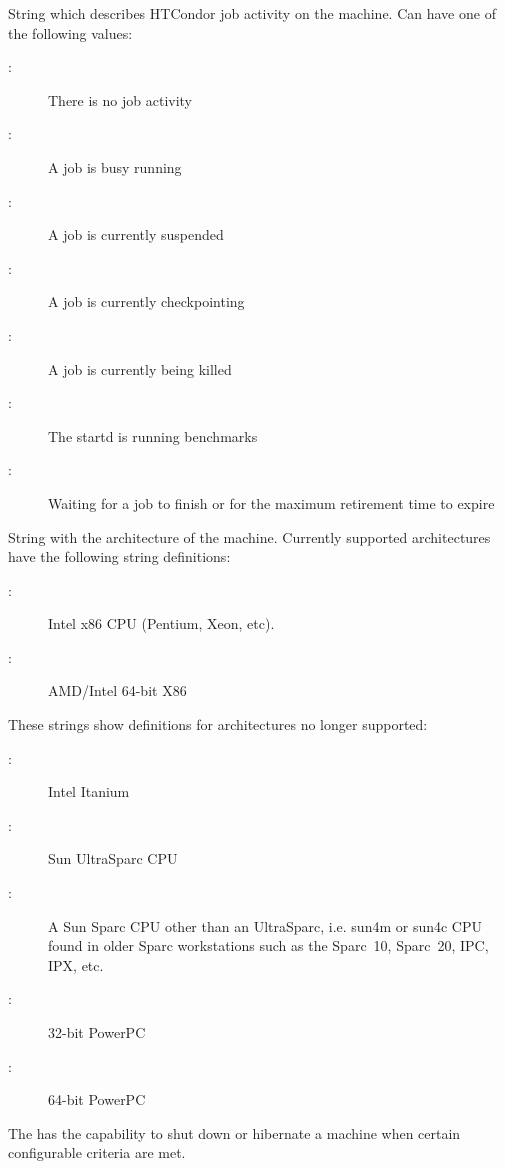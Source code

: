 \begin{description}
%
\item[\AdAttr{Activity}:] String which describes HTCondor job activity on the machine.
Can have one of the following values:
	\begin{description}
	\item[:] There is no job activity
	\item[:] A job is busy running
	\item[:] A job is currently suspended
	\item[:] A job is currently checkpointing
	\item[:] A job is currently being killed
	\item[:] The startd is running benchmarks
	\item[:] Waiting for a job to finish or for the maximum retirement time to expire
	\end{description}
%
\item[\AdAttr{Arch}:] String with the architecture of the machine.  
Currently supported architectures have the following string
definitions:
	\begin{description}
	\item[:] Intel x86 CPU (Pentium, Xeon, etc).
	\item[:] AMD/Intel 64-bit X86
	\end{description}
These strings show definitions for architectures no longer supported:
	\begin{description}
	\item[:] Intel Itanium
	\item[:] Sun UltraSparc CPU
	\item[:] A Sun Sparc CPU other than an UltraSparc, i.e.
sun4m or sun4c CPU found in older Sparc workstations such as the Sparc~10, 
Sparc~20, IPC, IPX, etc.
	\item[:] 32-bit PowerPC
	\item[:] 64-bit PowerPC
	\end{description}
%
\item[\AdAttr{CanHibernate}:] The  has the capability to 
shut down or hibernate a machine when certain configurable criteria are met.

\end{description}
